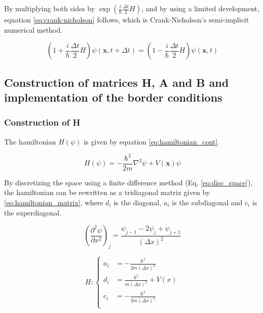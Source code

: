 \documentclass[a4paper,12pt,twoside]{article}
\newcommand{\mbf}[1]{\mathbf{#1}} %
\newcommand{\bracket}[1]{\left(#1\right)}
\begin{document}
    By multiplying both sides by $\exp\bracket{\frac{i}{\hbar}\frac{\Delta t}{2}H}$, and by using a limited development, equation \eqref{eq:crank-nicholson} follows, which is Crank-Nicholson's semi-implicit numerical method.

    \begin{equation}
      \bracket{1 + \frac{i}{\hbar}\frac{\Delta t}{2}H}\psi(\mbf{x}, t + \Delta t) = \bracket{1 - \frac{i}{\hbar}\frac{\Delta t}{2}H}\psi(\mbf{x}, t)
      \label{eq:crank_nicholson}
    \end{equation}



  \subsection{Construction of matrices H, A and B and implementation of the border conditions}
    \subsubsection{Construction of H}\label{sec:constr_H}
      The hamiltonian $H(\psi)$ is given by equation \eqref{eq:hamiltonian_cont}.

      \begin{equation}
        H(\psi) = -\frac{\hbar^2}{2m}\nabla^2\psi + V(\mbf{x})\psi
        \label{eq:hamiltonian_cont}
      \end{equation}

      By discretizing the space using a finite difference method (Eq. \eqref{eq:disc_space}), the hamiltonian can be rewritten as a tridiagonal matrix given by \eqref{eq:hamiltonian_matrix}, where $d_i$ is the diagonal, $a_i$ is the subdiagonal and $c_i$ is the superdiagonal.

      \begin{equation}
        \bracket{\frac{\partial^2\psi}{\partial x^2}}_j = \frac{\psi_{j-1} - 2\psi_j + \psi_{j+1}}{\bracket{\Delta x}^2}
        \label{eq:disc_space}
      \end{equation}

      \begin{equation}
        H: \begin{cases}
          a_i &= -\frac{\hbar^2}{2m(\Delta x)^2}\\
          d_i &= \frac{\hbar^2}{m(\Delta x)^2} + V(x)\\
          c_i &= -\frac{\hbar^2}{2m(\Delta x)^2}\\
        \end{cases}
        \label{eq:hamiltonian_matrix}
      \end{equation}
\end{document}
